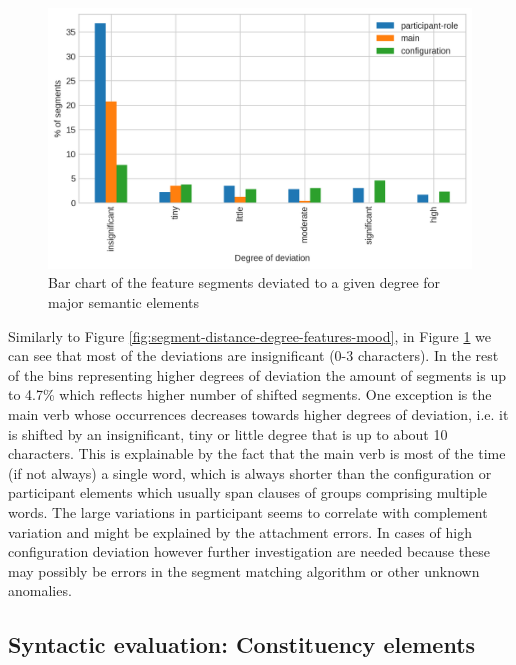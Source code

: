 \begin{figure}[!ht]
    \centering
    \includegraphics[width=.7\textwidth]{evaluation-results/figures/distance-degree-features-semantic}
    \caption{Bar chart of the feature segments deviated to a given degree for major semantic elements}
    \label{fig:segment-distance-degree-features-trans}
\end{figure}

Similarly to Figure \ref{fig:segment-distance-degree-features-mood}, in Figure \ref{fig:segment-distance-degree-features-trans} we can see that most of the deviations are insignificant (0-3 characters). In the rest of the bins representing higher degrees of deviation the amount of segments is up to 4.7\% which reflects higher number of shifted segments. One exception is the main verb whose occurrences decreases towards higher degrees of deviation, i.e. it is shifted by an insignificant, tiny or little degree that is up to about 10 characters. This is explainable by the fact that the main verb is most of the time (if not always) a single word, which is always shorter than the configuration or participant elements which usually span clauses of groups comprising multiple words. The large variations in participant seems to correlate with complement variation and might be explained by the attachment errors. In cases of high configuration deviation however further investigation are needed because these may possibly be errors in the segment matching algorithm or other unknown anomalies.

\subsection{Syntactic evaluation: Constituency elements}

